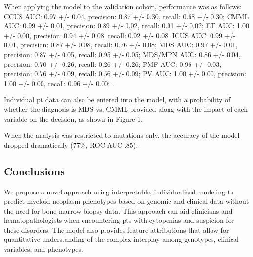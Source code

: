 When applying the model to the validation cohort, performance was as follows: CCUS AUC: 0.97 +/- 0.04, precision: 0.87 +/- 0.30, recall: 0.68 +/- 0.30; CMML AUC: 0.99 +/- 0.01, precision: 0.89 +/- 0.02, recall: 0.91 +/- 0.02; ET AUC: 1.00 +/- 0.00, precision: 0.94 +/- 0.08, recall: 0.92 +/- 0.08; ICUS AUC: 0.99 +/- 0.01, precision: 0.87 +/- 0.08, recall: 0.76 +/- 0.08; MDS AUC: 0.97 +/- 0.01, precision: 0.87 +/- 0.05, recall: 0.95 +/- 0.05; MDS/MPN AUC: 0.86 +/- 0.04, precision: 0.70 +/- 0.26, recall: 0.26 +/- 0.26; PMF AUC: 0.96 +/- 0.03, precision: 0.76 +/- 0.09, recall: 0.56 +/- 0.09; PV AUC: 1.00 +/- 0.00, precision: 1.00 +/- 0.00, recall: 0.96 +/- 0.00; .

Individual pt data can also be entered into the model, with a probability of whether the diagnosis is MDS vs. CMML provided along with the impact of each variable on the decision, as shown in Figure 1.

When the analysis was restricted to mutations only, the accuracy of the model dropped dramatically (77\%, ROC-AUC .85).


\subsection{Conclusions}%

We propose a novel approach using interpretable, individualized modeling to predict myeloid neoplasm phenotypes based on genomic and clinical data without the need for bone marrow biopsy data. This approach can aid clinicians and hematopathologists when encountering pts with cytopenias and suspicion for these disorders. The model also provides feature attributions that allow for quantitative understanding of the complex interplay among genotypes, clinical variables, and phenotypes.



